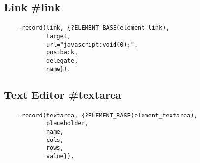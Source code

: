 \subsection{Link {\bf \#link}}

\paragraph{}
\vspace{1\baselineskip}
\begin{lstlisting}
    -record(link, {?ELEMENT_BASE(element_link),
            target,
            url="javascript:void(0);",
            postback,
            delegate,
            name}).
\end{lstlisting}
\vspace{1\baselineskip}

\subsection{Text Editor {\bf \#textarea}}

\paragraph{}
\vspace{1\baselineskip}
\begin{lstlisting}
    -record(textarea, {?ELEMENT_BASE(element_textarea),
            placeholder,
            name,
            cols,
            rows,
            value}).
\end{lstlisting}
\vspace{1\baselineskip}
